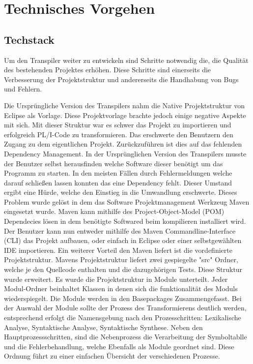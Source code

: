 \section{Technisches Vorgehen}
\subsection{Techstack}
Um den Transpiler weiter zu entwickeln sind Schritte notwendig die, die Qualität des bestehenden Projektes erhöhen. Diese Schritte sind einerseits die Verbesserung der Projektstruktur und andererseits die Handhabung von Bugs und Fehlern.

Die Ursprüngliche Version des Transpilers nahm die Native Projektstruktur von Eclipse als Vorlage. Diese Projektvorlage brachte jedoch einige negative Aspekte mit sich. Mit dieser Struktur war es schwer das Projekt zu importieren und erfolgreich PL/I-Code zu transformieren. Das erschwerte den Benutzern den Zugang zu dem eigentlichen Projekt.
Zurückzuführen ist dies auf das fehlenden Dependency Management. In der Ursprünglichen Version des Transpilers musste der Benutzer selbst herausfinden welche Software dieser benötigt um das Programm zu starten. In den meisten Fällen durch Fehlermeldungen welche darauf schließen lassen konnten das eine Dependency fehlt. Dieser Umstand ergibt eine Hürde, welche den Einstieg in die Umwandlung erschwerte. 
Dieses Problem wurde gelöst in dem das Software Projektmanagement Werkzeug Maven eingesetzt wurde. Maven kann mithilfe des Project-Object-Model (POM) Dependecies lösen in dem benötigte Softwared beim kompilieren installiert wird. Der Benutzer kann nun entweder mithilfe des Maven Commandline-Interface (CLI) das Projekt aufbauen, oder einfach in Eclipse oder einer selbstgewählten IDE importieren.
Ein weiterer Vorteil den Maven liefert ist die vordefinierte Projektstruktur. Mavens Projektstruktur liefert zwei gespiegelte "src" Ordner, welche je den Quellcode enthalten und die dazugehörigen Tests. Diese Struktur wurde erweitert. Es wurde die Projektstruktur in Module unterteilt. Jeder Modul-Ordner beinhaltet Klassen in denen sich die funktionalität des Moduls wiederspiegelt. Die Module werden in den Basepackages Zusammengefasst. Bei der Auswahl der Module sollte der Prozess des Transformierens deutlich werden, entsprechend erfolgt die Namensgebung nach den Prozesschritten: Lexikalische Analyse, Syntaktische Analyse, Syntaktische Synthese. Neben den Hauptprozessschritten, sind die Nebenprozess die Verarbeitung der Symboltablle und die Fehlerbehandlung, welche Ebenfalls als Module geordnet sind. Diese Ordnung führt zu einer einfachen Übersicht der verschiedenen Prozesse.

